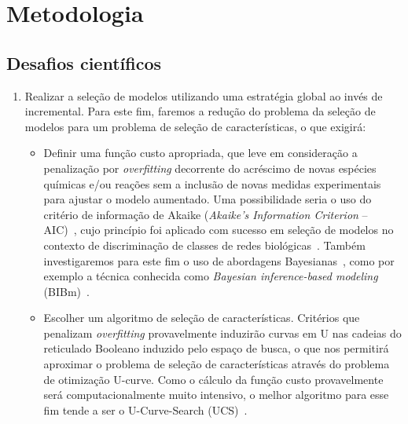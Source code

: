 \documentclass[12pt]{article}
\begin{document}
\section{Metodologia}



\subsection{Desafios científicos}

\begin{enumerate}

\item Realizar a seleção de modelos utilizando uma estratégia global ao invés de incremental. Para este fim, faremos a redução do problema da seleção de modelos para um problema de seleção de características, o que exigirá:
\begin{itemize}
  \item Definir uma função custo apropriada, que leve em consideração a penalização por {\em overfitting} decorrente do acréscimo de novas espécies químicas e/ou reações sem a inclusão de novas medidas experimentais para ajustar o modelo aumentado. Uma possibilidade seria o uso do critério de informação de Akaike ({\em Akaike's Information Criterion} -- AIC)~\cite{bozdogan1987model}, cujo princípio foi aplicado com sucesso em seleção de modelos no contexto de discriminação de classes de redes biológicas~\cite{takahashi2012discriminating}. Também investigaremos para este fim o uso de abordagens Bayesianas~\cite{kirk2013model}, como por exemplo a técnica conhecida como {\em Bayesian inference-based modeling} (BIBm)~\cite{Xu2010}.

  \item Escolher um algoritmo de seleção de características. Critérios que penalizam {\em overfitting} provavelmente induzirão curvas em U nas cadeias do reticulado Booleano induzido pelo espaço de busca, o que nos permitirá aproximar o problema de seleção de características através do problema de otimização U-curve. Como o cálculo da função custo provavelmente será computacionalmente muito intensivo, o melhor algoritmo para esse fim tende a ser o U-Curve-Search (UCS)~\cite{reis2012minimizaccao,reis2017ucsr}.
\end{itemize}


\end{enumerate}
\end{document}
